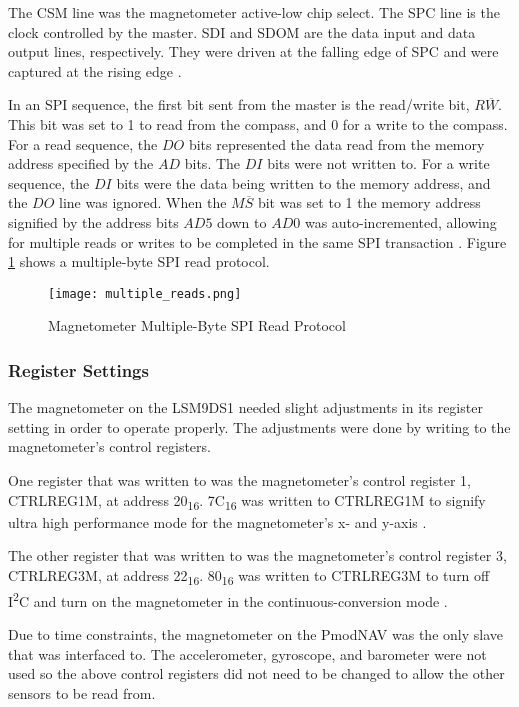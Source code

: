The CS\textunderscore{}M line was the magnetometer active-low chip select. The SPC line is the clock controlled by the master. SDI and SDO\textunderscore{}M are the data input and data output lines, respectively. They were driven at the falling edge of SPC and were captured at the rising edge \cite{lsm9ds1}.
\par
In an SPI sequence, the first bit sent from the master is the read/write bit, $R\overline{W}$. This bit was set to 1 to read from the compass, and 0 for a write to the compass. For a read sequence, the $DO$ bits represented the data read from the memory address specified by the $AD$ bits. The $DI$ bits were not written to. For a write sequence, the $DI$ bits were the data being written to the memory address, and the $DO$ line was ignored. When the $M\overline{S}$ bit was set to 1 the memory address signified by the address bits $AD5$ down to $AD0$ was auto-incremented, allowing for multiple reads or writes to be completed in the same SPI transaction \cite{lsm9ds1}. Figure \ref{multiple_reads} shows a multiple-byte SPI read protocol. 

\begin{figure}[H]
	\centerline{\texttt{[image: multiple\_reads.png]}}
	\caption{Magnetometer Multiple-Byte SPI Read Protocol \cite{lsm9ds1}}
	\label{multiple_reads}
\end{figure}

\subsubsection{Register Settings} \label{imu_settings}
The magnetometer on the LSM9DS1 needed slight adjustments in its register setting in order to operate properly. The adjustments were done by writing to the magnetometer's control registers.
\par
One register that was written to was the magnetometer's control register 1, CTRL\textunderscore{}REG\textunderscore{}1\textunderscore{}M, at address 20\textsubscript{16}. 7C\textsubscript{16} was written to CTRL\textunderscore{}REG\textunderscore{}1\textunderscore{}M to signify ultra high performance mode for the magnetometer's x- and y-axis \cite{lsm9ds1}.
\par
The other register that was written to was the magnetometer's control register 3, CTRL\textunderscore{}REG\textunderscore{}3\textunderscore{}M, at address 22\textsubscript{16}. 80\textsubscript{16} was written to CTRL\textunderscore{}REG\textunderscore{}3\textunderscore{}M to turn off I\textsuperscript{2}C and turn on the magnetometer in the continuous-conversion mode \cite{lsm9ds1}.
\par
Due to time constraints, the magnetometer on the PmodNAV was the only slave that was interfaced to. The accelerometer, gyroscope, and barometer were not used so the above control registers did not need to be changed to allow the other sensors to be read from.

